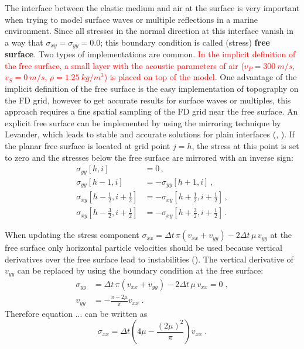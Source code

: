 The interface between the elastic medium and air at the surface is very important when trying to model surface waves or multiple reflections in a marine environment. Since all stresses in the normal direction at this interface vanish in a way that $\sigma_{xy} = \sigma_{yy}=0.0$; this boundary condition is called (stress) {\textbf{free surface}}. Two types of implementations are common. \textcolor{red}{In the implicit definition of the free surface, a small layer with the acoustic parameters of air
($v_P=\SI{300}{m/s}$, $v_S=\SI{0}{m/s}$, $\rho=\SI{1.25}{kg/m^3}$) is placed on top of the model}. One advantage of the implicit definition of the free surface is the easy implementation of topography on the FD grid, however to get accurate results for surface waves or multiples, this approach requires a fine spatial sampling of the FD grid near the free surface. An explicit free surface can be implemented by using the mirroring technique by Levander, which leads to stable and accurate solutions for plain interfaces (\cite{levander:88}, \cite{robertsson:95}). If the planar free surface is located at grid point $j=h$, the stress at this point is set to zero and the stresses below the free surface are mirrored with an inverse sign:
\begin{equation}
\begin{split}
        \sigma_{yy}[h,i] &= 0\,,\\
        \sigma_{yy}[h-1,i] &= - \sigma_{yy}[h+1,i]\,,\\
        \sigma_{xy}[h-\frac{1}{2},i+\frac{1}{2}] &= - \sigma_{xy}[h+\frac{1}{2},i+\frac{1}{2}]\,,\\
        \sigma_{xy}[h-\frac{3}{2},i+\frac{1}{2}] &= - \sigma_{xy}[h+\frac{3}{2},i+\frac{1}{2}]\,.
\end{split}
\end{equation}

When updating the stress component $\sigma_{xx}=\Delta t\, \pi (v_{xx} + v_{yy}) -2 {\Delta t}\, \mu\, v_{yy}$ at the free surface only horizontal particle velocities should be used because vertical derivatives over the free surface lead to instabilities (\cite{levander:88}). 
The vertical derivative of $v_{yy}$ can be replaced by using the boundary condition at the free surface:
\begin{equation}
\begin{split}
    \sigma_{yy} &= {\Delta t}\, \pi\left(v_{xx} + v_{yy}\right)  - 2 {\Delta t}\, \mu\, v_{xx} = 0\;,\\
    v_{yy} &= - \frac{\pi-2\mu}{\pi} v_{xx}\;.
\end{split}
\end{equation}
Therefore equation ... can be written as
\begin{equation}
\sigma_{xx}={\Delta t}\left(4\mu -\frac{(2\mu)^2}{\pi} \right) v_{xx}\;.
\end{equation}

